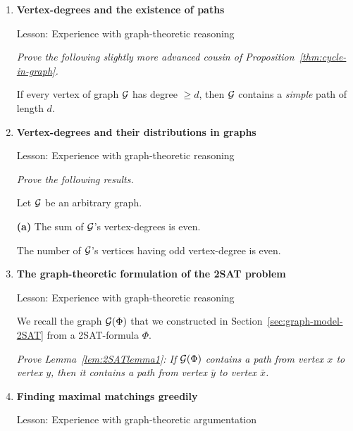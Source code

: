 \begin{enumerate}
\item
{\bf Vertex-degrees and the existence of paths}

{\sc Lesson:} Experience with graph-theoretic reasoning

\smallskip

{\em Prove the following slightly more advanced cousin of Proposition~\ref{thm:cycle-in-graph}.}

 

\begin{prop}
If every vertex of graph $\mbox{$\cal G$}$ has degree $\geq d$, then $\mbox{$\cal G$}$ contains a {\em simple} path of length $d$.
\end{prop}

\smallskip

\medskip\item
{\bf Vertex-degrees and their distributions in graphs}

{\sc Lesson:} Experience with graph-theoretic reasoning

\smallskip

{\em Prove the following results.}

\begin{prop}
Let $\mbox{$\cal G$}$ be an arbitrary graph.
\smallskip

\noindent
{\bf (a)} The sum of $\mbox{$\cal G$}$'s vertex-degrees is even.

\smallskip

The number of $\mbox{$\cal G$}$'s vertices having odd vertex-degree is even.
\end{prop}

\medskip\item
{\bf The graph-theoretic formulation of the {\sf 2SAT} problem}

{\sc Lesson:} Experience with graph-theoretic reasoning

\smallskip

We recall the graph $\mbox{$\cal G$}(\Phi)$ that we constructed in Section~\ref{sec:graph-model-2SAT} from a {\sf 2SAT}-formula $\Phi$.

\smallskip

{\em Prove Lemma~\ref{lem:2SATlemma1}:
If $\mbox{$\cal G$}(\Phi)$ contains a path from vertex $x$ to vertex $y$, then it contains a path from vertex $\bar{y}$ to vertex $\bar{x}$.}

\medskip\item
{\bf Finding maximal matchings greedily}

{\sc Lesson:} Experience with graph-theoretic argumentation


\end{enumerate}
